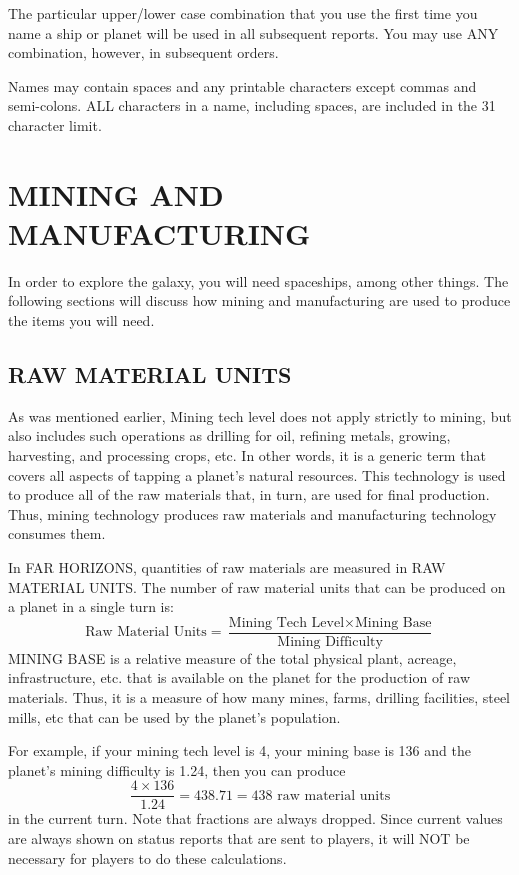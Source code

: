 \documentclass[10pt,titlepage]{article}
\begin{document}
The particular upper/lower case combination that you use the first time you
name a ship or planet will be used in all subsequent reports.  You may use
ANY combination, however, in subsequent orders.

Names may contain spaces and any printable characters except commas and
semi-colons.  ALL characters in a name, including spaces, are included in
the 31 character limit.



\section{MINING AND MANUFACTURING}
\label{sec:miningandmanufacturing}

In order to explore the galaxy, you will need spaceships, among other things.
The following sections will discuss how mining and manufacturing are used to
produce the items you will need.


\subsection{RAW MATERIAL UNITS}
\label{sec:rawmaterialunits}


As was mentioned earlier, Mining tech level does not apply strictly to mining,
but also includes such operations as drilling for oil, refining metals,
growing, harvesting, and processing crops, etc.  In other words, it is a
generic term that covers all aspects of tapping a planet's natural resources.
This technology is used to produce all of the raw materials that, in turn, are
used for final production.  Thus, mining technology produces raw materials and
manufacturing technology consumes them.

In FAR HORIZONS, quantities of raw materials are measured in RAW MATERIAL
UNITS.  The number of raw material units that can be produced on a planet in a
single turn is:
\begin{equation*}
	\textrm{Raw Material Units}  = \dfrac{\textrm{Mining Tech Level}  \times  \textrm{Mining Base}}{\textrm{Mining Difficulty}}
\end{equation*}
MINING BASE is a relative measure of the total physical plant, acreage,
infrastructure, etc. that is available on the planet for the production of
raw materials.  Thus, it is a measure of how many mines, farms, drilling
facilities, steel mills, etc that can be used by the planet's population.

For example, if your mining tech level is 4, your mining base is 136 and the
planet's mining difficulty is 1.24, then you can produce
\begin{equation*}
\dfrac{4  \times  136}{1.24} = 438.71 = 438 \textrm{ raw material units}
\end{equation*}
in the current turn.  Note that fractions are always dropped.  Since current
values are always shown on status reports that are sent to players, it will
NOT be necessary for players to do these calculations.
\end{document}
